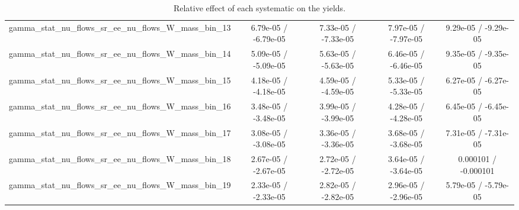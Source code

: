 \documentclass[10pt]{article}
\begin{document}
\begin{table}[htbp]
\begin{center}
\begin{tabular}{|c|c|c|c|c|}
  gamma_stat_nu_flows_sr_ee_nu_flows_W_mass_bin_13 & 6.79e-05 / -6.79e-05 & 7.33e-05 / -7.33e-05 & 7.97e-05 / -7.97e-05 & 9.29e-05 / -9.29e-05 \\ 
  gamma_stat_nu_flows_sr_ee_nu_flows_W_mass_bin_14 & 5.09e-05 / -5.09e-05 & 5.63e-05 / -5.63e-05 & 6.46e-05 / -6.46e-05 & 9.35e-05 / -9.35e-05 \\ 
  gamma_stat_nu_flows_sr_ee_nu_flows_W_mass_bin_15 & 4.18e-05 / -4.18e-05 & 4.59e-05 / -4.59e-05 & 5.33e-05 / -5.33e-05 & 6.27e-05 / -6.27e-05 \\ 
  gamma_stat_nu_flows_sr_ee_nu_flows_W_mass_bin_16 & 3.48e-05 / -3.48e-05 & 3.99e-05 / -3.99e-05 & 4.28e-05 / -4.28e-05 & 6.45e-05 / -6.45e-05 \\ 
  gamma_stat_nu_flows_sr_ee_nu_flows_W_mass_bin_17 & 3.08e-05 / -3.08e-05 & 3.36e-05 / -3.36e-05 & 3.68e-05 / -3.68e-05 & 7.31e-05 / -7.31e-05 \\ 
  gamma_stat_nu_flows_sr_ee_nu_flows_W_mass_bin_18 & 2.67e-05 / -2.67e-05 & 2.72e-05 / -2.72e-05 & 3.64e-05 / -3.64e-05 & 0.000101 / -0.000101 \\ 
  gamma_stat_nu_flows_sr_ee_nu_flows_W_mass_bin_19 & 2.33e-05 / -2.33e-05 & 2.82e-05 / -2.82e-05 & 2.96e-05 / -2.96e-05 & 5.79e-05 / -5.79e-05 \\ 
\hline 
\end{tabular} 
\caption{Relative effect of each systematic on the yields.} 
\end{center} 
\end{table} 
\end{document}
